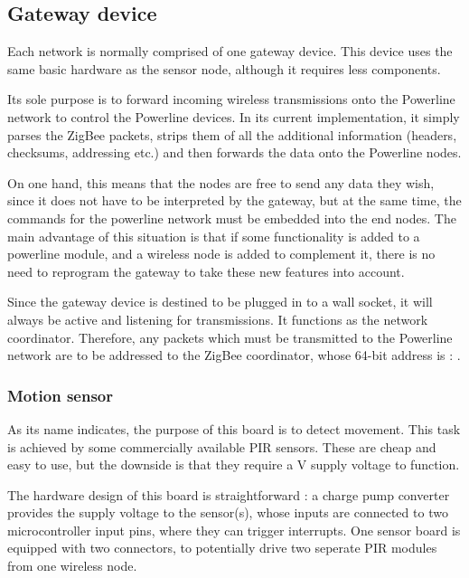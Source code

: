 \subsection{Gateway device}

Each network is normally comprised of one gateway device. This device uses the
same basic hardware as the sensor node, although it requires less components.


Its sole purpose is to forward incoming wireless transmissions onto the
Powerline network to control the Powerline devices. In its current
implementation, it simply parses the ZigBee packets, strips them of all the
additional information (headers, checksums, addressing etc.) and then forwards
the data onto the Powerline nodes.

On one hand, this means that the nodes are free to send any data they wish,
since it does not have to be interpreted by the gateway, but at the same time,
the commands for the powerline network must be embedded into the end nodes. The
main advantage of this situation is that if some functionality is added to a
powerline module, and a wireless node is added to complement it, there is no
need to reprogram the gateway to take these new features into account.

Since the gateway device is destined to be plugged in to a wall socket, it will
always be active and listening for transmissions. It functions as the network
coordinator. Therefore, any packets which must be transmitted to the Powerline
network are to be addressed to the ZigBee coordinator, whose 64-bit address is :
.

\subsubsection{Motion sensor}


As its name indicates, the purpose of this board is to detect movement. This
task is achieved by some commercially available PIR sensors. These are cheap and
easy to use, but the downside is that they require a \unit[5]{V} supply voltage
to function.

The hardware design of this board is straightforward : a charge pump converter
provides the supply voltage to the sensor(s), whose inputs are connected to two
microcontroller input pins, where they can trigger interrupts. One sensor board
is equipped with two connectors, to potentially drive two seperate PIR modules
from one wireless node.

